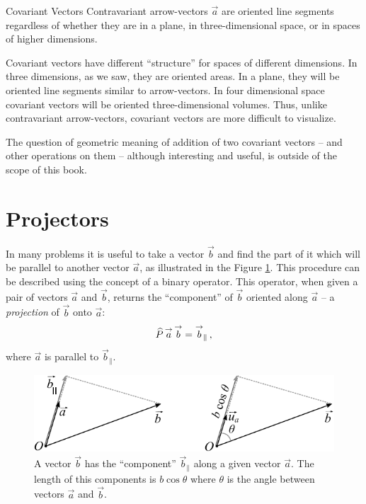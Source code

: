 \begin{mybio}{Covariant Vectors}
Contravariant arrow-vectors $\vec{a}$ are oriented line segments
regardless of whether they are in a plane, in three-dimensional space, or in spaces
of higher dimensions.

Covariant vectors have different ``structure''
for spaces of different
dimensions. In three dimensions, as we saw, they are oriented
areas. In a plane, they will be oriented line segments similar to
arrow-vectors. In four dimensional space covariant vectors will be
oriented three-dimensional volumes. Thus, unlike contravariant
arrow-vectors, covariant vectors are more difficult to visualize.

The question of geometric meaning of addition of two covariant
vectors -- and other operations on them -- although interesting and
useful, is outside of the scope of this book.
\end{mybio}


\section{Projectors}\label{sec:Projectors}
In many problems it is useful to take a vector $\vec{b}$ and find the
part of it which will be parallel to another vector $\vec{a}$, as illustrated in the
Figure \ref{fig:projector}. This procedure can be described using the
concept of a binary operator. This operator, when given a pair of
vectors $\vec{a}$ and $\vec{b}$, returns the ``component'' of
$\vec{b}$ oriented along $\vec{a}$ -- a \emph{projection} of $\vec{b}$
onto $\vec{a}$:
\[
\widehat{P}\, \overset{\rightarrow}{a}\, \overset{\rightarrow}{b} = \overset{\rightarrow}{b}_\parallel\,,
\]
where $\vec{a}$ is parallel to $\vec{b}_\parallel$.

\begin{figure}[htbp]
  \centering
  \includegraphics[scale=1.0]{projector}
  \caption{A vector $\vec{b}$ has the ``component'' $\vec{b}_\parallel$ along a given vector
    $\vec{a}$. The length of this components is $b\cos\theta$ where
    $\theta$ is the angle between vectors $\vec{a}$ and $\vec{b}$.}
  \label{fig:projector}
\end{figure}

